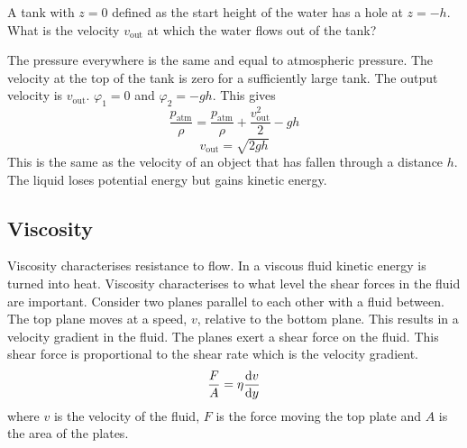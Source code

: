 \documentclass{article}
\begin{document}
    \example
    A tank with \(z = 0\) defined as the start height of the water has a hole at \(z = -h\).
    What is the velocity \(v_\text{out}\) at which the water flows out of the tank?
    
    The pressure everywhere is the same and equal to atmospheric pressure.
    The velocity at the top of the tank is zero for a sufficiently large tank.
    The output velocity is \(v_\text{out}\).
    \(\varphi_1 = 0\) and \(\varphi_2 = -gh\).
    This gives
    \[\frac{p_\text{atm}}{\rho} = \frac{p_\text{atm}}{\rho} + \frac{v_\text{out}^2}{2} - gh\]
    \[v_\text{out} = \sqrt{2gh}\]
    This is the same as the velocity of an object that has fallen through a distance \(h\).
    The liquid loses potential energy but gains kinetic energy.
    
    \subsection{Viscosity}
    Viscosity characterises resistance to flow.
    In a viscous fluid kinetic energy is turned into heat.
    Viscosity characterises to what level the shear forces in the fluid are important.
    Consider two planes parallel to each other with a fluid between.
    The top plane moves at a speed, \(v\), relative to the bottom plane.
    This results in a velocity gradient in the fluid.
    The planes exert a shear force on the fluid.
    This shear force is proportional to the shear rate which is the velocity gradient.
    \[\frac{F}{A} = \eta\dv{v}{y}\]
    where \(v\) is the velocity of the fluid, \(F\) is the force moving the top plate and \(A\) is the area of the plates.
    \begin{figure}[ht]
        \centering
        \label{Shear force on a fluid}
    \end{figure}
    
    
\end{document}
